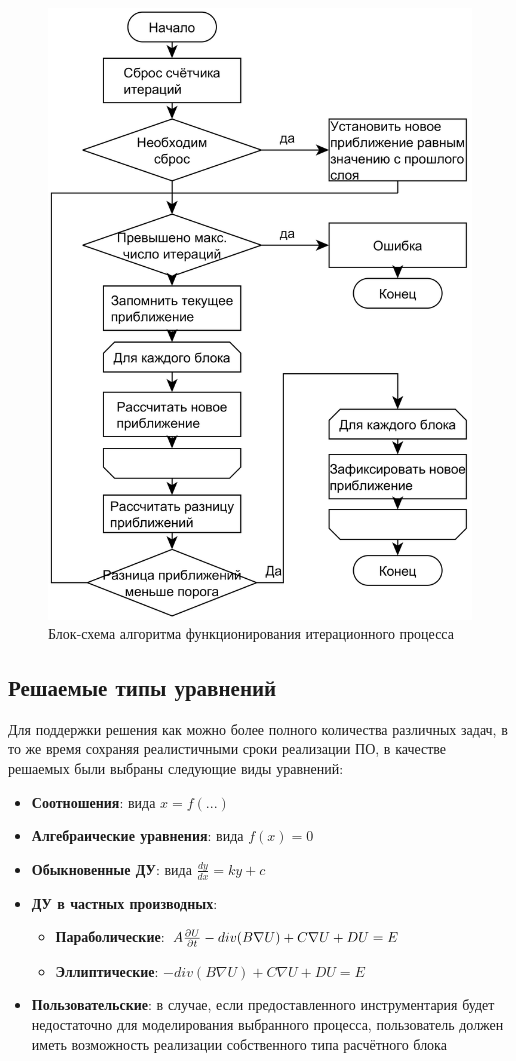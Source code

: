 \begin{figure}
    \centering
    \includegraphics[width=.5\textwidth]{img/flowchart/iterative}
    \caption{Блок-схема алгоритма функционирования итерационного процесса}
    \label{fig:flowchartIterative}
\end{figure}

\subsection{Решаемые типы уравнений}
Для поддержки решения как можно более полного количества различных задач, в то 
же время сохраняя реалистичными сроки реализации ПО, в качестве решаемых были 
выбраны следующие виды уравнений:
\begin{itemize}
    \item \textbf{Соотношения}: вида $x = f(...)$
    \item \textbf{Алгебраические уравнения}: вида $f(x) = 0$
    \item \textbf{Обыкновенные ДУ}: вида $\frac{dy}{dx} = ky + c$
    \item \textbf{ДУ в частных производных}:
        \begin{itemize}
            \item \textbf{Параболические}: $A\frac{\partial U}{\partial t} - 
            div(B \nabla U) + C \nabla U + D U = E$
            \item \textbf{Эллиптические}: $- div(B \nabla U) + C \nabla U + D U 
            = E$
        \end{itemize}
    \item \textbf{Пользовательские}: в случае, если предоставленного 
    инструментария будет недостаточно для моделирования выбранного процесса, 
    пользователь должен иметь возможность реализации собственного типа 
    расчётного блока
\end{itemize}

